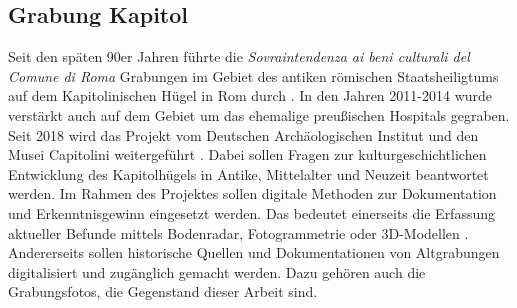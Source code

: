 \subsection{Grabung Kapitol}
Seit den späten 90er Jahren führte die \textit{Sovraintendenza ai beni culturali del Comune di Roma} Grabungen im Gebiet des antiken römischen Staatsheiligtums auf dem Kapitolinischen Hügel in Rom durch \cite{danti}. In den Jahren 2011-2014 wurde verstärkt auch auf dem Gebiet um das ehemalige preußischen Hospitals gegraben. Seit 2018 wird das Projekt vom Deutschen Archäologischen Institut und den Musei Capitolini weitergeführt \cite{kapitol}. Dabei sollen Fragen zur \glqq kulturgeschichtlichen Entwicklung des Kapitolhügels in Antike, Mittelalter und Neuzeit\grqq  \cite{kapitol} beantwortet werden.
Im Rahmen des Projektes sollen digitale Methoden zur Dokumentation und Erkenntnisgewinn eingesetzt werden. Das bedeutet einerseits die Erfassung aktueller Befunde mittels Bodenradar, Fotogrammetrie oder 3D-Modellen \cite{kapitol}. Andererseits sollen historische Quellen und Dokumentationen von Altgrabungen digitalisiert und zugänglich gemacht werden. Dazu gehören auch die Grabungsfotos, die Gegenstand dieser Arbeit sind.






